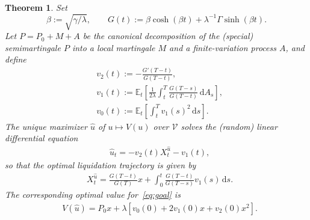 \documentclass[11pt]{article}
\newtheorem{thm}{Theorem}[section]
\theoremstyle{definition}
\theoremstyle{remark}
\newtheorem{rem}[thm]{Remark}
\newcommand{\E}{\mathbb{E}} %
\DeclarePairedDelimiter{\abs}{\lvert}{\rvert} %
\newcommand{\ts}{\textstyle}
\newcommand{\closeEqn}{\tag*{$\diamond$}}
\newcommand{\de}{\,\mathrm{d}}
\begin{document}
\begin{thm}\label{main}
Set 
$$\beta:=\sqrt{\gamma/\lambda}, \qquad G(t):= \beta\cosh(\beta t)+\lambda^{-1}\Gamma\sinh(\beta t).
$$
Let $P=P_0+M+A$ be the canonical decomposition of the (special) semimartingale $P$ into a local martingale $M$ and a finite-variation process $A$, and define 
\begin{align*}
& v_2(t):= %
-\frac{G'(T-t)}{G(T-t)},\\%
& v_1(t):= \E_t\left[ \frac{1}{2\lambda}\int_t^T \frac{G(T-s)}{G(T-t)} \de A_s \right],\\ %
& v_0(t):= \E_t\left[ \int_t^T v_1(s)^2 \de s \right].
\end{align*}
The unique maximizer $\hat{u}$ of $u\mapsto V(u)$ over $\mathcal V$ solves the (random) linear differential equation
\begin{align}\label{eq:ODE}
&\hat{u}_t = -v_2(t) X^{\hat{u}}_t - v_1(t),
\end{align}
so that the optimal liquidation trajectory is given by
\begin{align}\label{eq:Pos}
&X^{\hat{u}}_t = \frac{G(T-t)}{G(T)}x + \int_0^t \frac{G(T-t)}{G(T-s)} v_1(s) \de s.
\end{align}
The corresponding optimal value for~\eqref{eq:goal} is
\begin{align}
&\ts V(\hat{u}) = P_0 x + \lambda\left[v_0(0) + 2 v_1(0) x + v_2(0) x^2\right].\closeEqn
\end{align}
\end{thm}

\end{document}
